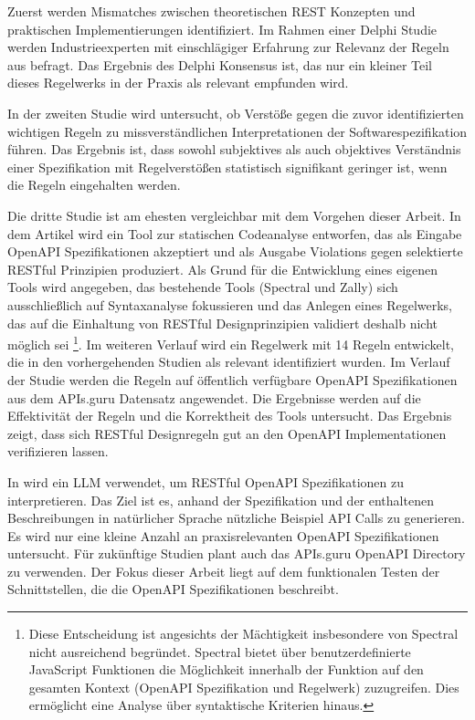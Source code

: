 Zuerst werden \glqq Mismatches zwischen theoretischen \acs{REST} Konzepten und praktischen Implementierungen\grqq{} \parencite{kotstein_which_2021} identifiziert. Im Rahmen einer Delphi Studie \parencite{kotstein_which_2021} werden Industrieexperten mit einschlägiger Erfahrung zur Relevanz der Regeln aus \parencite{masse_rest_2011} befragt. Das Ergebnis des Delphi Konsensus ist, das nur ein kleiner Teil dieses Regelwerks in der Praxis als relevant empfunden wird. 

In der zweiten Studie \parencite{bogner_restful_2023} wird untersucht, ob Verstöße gegen die zuvor identifizierten wichtigen Regeln zu missverständlichen Interpretationen der Softwarespezifikation führen. Das Ergebnis ist, dass sowohl subjektives als auch objektives Verständnis einer Spezifikation mit Regelverstößen statistisch signifikant geringer ist, wenn die Regeln eingehalten werden. 

Die dritte Studie ist am ehesten vergleichbar mit dem Vorgehen dieser Arbeit. In dem Artikel wird ein Tool zur statischen Codeanalyse entworfen, das als Eingabe OpenAPI Spezifikationen akzeptiert und als Ausgabe Violations gegen selektierte \acs{REST}ful Prinzipien produziert. Als Grund für die Entwicklung eines eigenen Tools wird angegeben, das bestehende Tools (Spectral und Zally) sich ausschließlich auf Syntaxanalyse fokussieren und das Anlegen eines Regelwerks, das auf die Einhaltung von \acs{REST}ful Designprinzipien validiert deshalb nicht möglich sei \parencite{bogner_restruler_2024}\footnote{Diese Entscheidung ist angesichts der Mächtigkeit insbesondere von Spectral nicht ausreichend begründet. Spectral bietet über benutzerdefinierte JavaScript Funktionen die Möglichkeit innerhalb der Funktion auf den gesamten Kontext (OpenAPI Spezifikation und Regelwerk) zuzugreifen. Dies ermöglicht eine Analyse über syntaktische Kriterien hinaus.}. Im weiteren Verlauf wird ein Regelwerk mit 14 Regeln entwickelt, die in den vorhergehenden Studien als relevant identifiziert wurden. Im Verlauf der Studie werden die Regeln auf öffentlich verfügbare OpenAPI Spezifikationen aus dem APIs.guru Datensatz angewendet. Die Ergebnisse werden auf die Effektivität der Regeln und die Korrektheit des Tools untersucht. Das Ergebnis zeigt, dass sich \acs{REST}ful Designregeln gut an den OpenAPI Implementationen verifizieren lassen.

In \parencite{kim_leveraging_2024} wird ein \acf{LLM} verwendet, um \acs{REST}ful OpenAPI Spezifikationen zu interpretieren. Das Ziel ist es, anhand der Spezifikation und der enthaltenen Beschreibungen in natürlicher Sprache nützliche Beispiel \acs{API} Calls zu generieren. Es wird nur eine kleine Anzahl an praxisrelevanten OpenAPI Spezifikationen untersucht. Für zukünftige Studien plant \parencite{kim_leveraging_2024} auch das APIs.guru OpenAPI Directory zu verwenden. Der Fokus dieser Arbeit liegt auf dem funktionalen Testen der Schnittstellen, die die OpenAPI Spezifikationen beschreibt.


